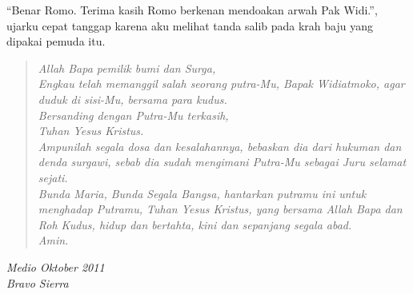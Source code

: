 ``Benar Romo. Terima kasih Romo berkenan mendoakan arwah Pak Widi.'', ujarku cepat tanggap karena aku melihat tanda salib pada krah baju yang dipakai pemuda itu. 

\begin{quote}
\textit{
Allah Bapa pemilik bumi dan Surga,\\
Engkau telah memanggil salah seorang putra-Mu, Bapak Widiatmoko,
 agar duduk di sisi-Mu, bersama para kudus. \\
Bersanding dengan Putra-Mu terkasih,\\ Tuhan Yesus Kristus.\\
 Ampunilah segala dosa dan kesalahannya, bebaskan dia dari hukuman dan denda surgawi, sebab dia sudah mengimani Putra-Mu sebagai Juru selamat sejati.\\
 Bunda Maria, Bunda Segala Bangsa, hantarkan putramu ini untuk menghadap Putramu, Tuhan Yesus Kristus, yang bersama Allah Bapa dan Roh Kudus, hidup dan bertahta, kini  dan sepanjang segala abad. \\Amin.}
\end{quote}

\begin{flushright}
\textit{Medio Oktober 2011 \\Bravo Sierra}
\end{flushright}
\normalsize
